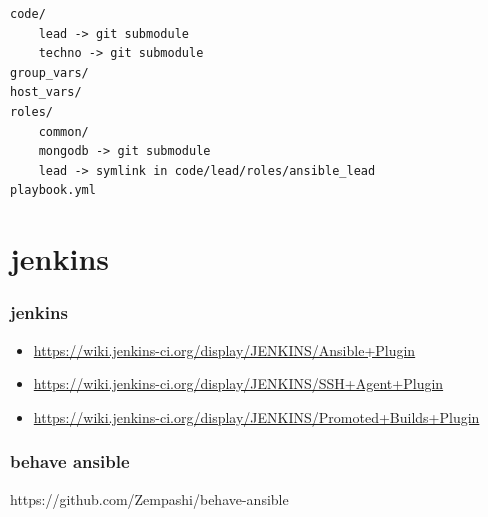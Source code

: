 \documentclass{beamer}
\begin{document}
\begin{frame}[fragile]
    \begin{Verbatim}
code/
    lead -> git submodule
    techno -> git submodule
group_vars/
host_vars/
roles/
    common/
    mongodb -> git submodule
    lead -> symlink in code/lead/roles/ansible_lead
playbook.yml
    \end{Verbatim}

\end{frame}


\section{jenkins}

\begin{frame}
    \frametitle{jenkins}
    \footnotesize{
    \begin{itemize}
        \item \href{https://wiki.jenkins-ci.org/display/JENKINS/Ansible+Plugin}
                    {https://wiki.jenkins-ci.org/display/JENKINS/Ansible+Plugin}
        \item \href{https://wiki.jenkins-ci.org/display/JENKINS/SSH+Agent+Plugin}
                    {https://wiki.jenkins-ci.org/display/JENKINS/SSH+Agent+Plugin}
        \item \href{https://wiki.jenkins-ci.org/display/JENKINS/Promoted+Builds+Plugin}
                    {https://wiki.jenkins-ci.org/display/JENKINS/Promoted+Builds+Plugin}
    \end{itemize}
    }
\end{frame}


\begin{frame}
    \frametitle{behave ansible}
    https://github.com/Zempashi/behave-ansible

\end{frame}
\end{document}

